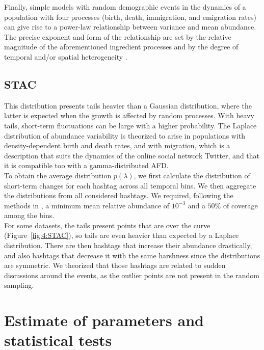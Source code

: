 Finally, simple models with random demographic events in the dynamics of a population with four processes (birth, death, immigration, and emigration rates) can give rise to a power-law relationship between variance and mean abundance. The precise exponent and form of the relationship are set by the relative magnitude of the aforementioned ingredient processes and by the degree of  temporal and/or spatial heterogeneity \cite{anderson1982variability}.

\subsection{STAC} This distribution presents tails heavier than a Gaussian distribution, where the latter is  expected when the growth is affected by random processes. With heavy tails, short-term fluctuations can be large with a higher probability. The Laplace distribution of abundance variability is theorized to arise in populations with density-dependent birth and death rates, and with migration, which is a description that suits the dynamics of the online social network Twitter, and that it is compatible too with a gamma-distributed AFD.\\
 
 To obtain the average distribution $p(\lambda)$, we first calculate the distribution of short-term changes for each hashtag across all temporal bins. We then aggregate the distributions from all considered hashtags. We required, following the methods in \cite{ji2020macroecological}, a minimum mean relative abundance of  $10^{-3}$ and a $50\%$ of coverage among the bins. \\

For some datasets, the tails present points that are over the curve (Figure~\ref{fig:4:STAC}), so tails are even heavier than expected by a Laplace distribution. There are then hashtags that increase their abundance drastically, and also hashtags that decrease it with the same  harshness since the distributions are symmetric. We theorized that those hashtags are related to sudden discussions around the events, as the outlier points are not present in the random sampling.

\newpage
 \section{Estimate of parameters and statistical tests \label{appen:patterns:tests}}

